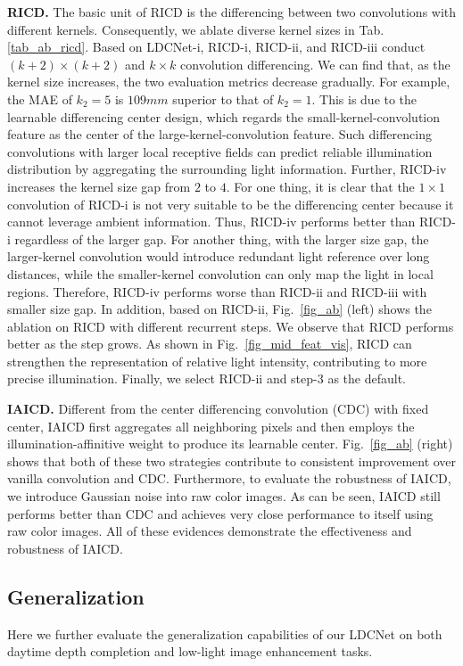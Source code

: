 \documentclass[lettersize,journal]{IEEEtran}
\begin{document}
\textbf{RICD.} The basic unit of RICD is the differencing between two convolutions with different kernels. Consequently, we ablate diverse kernel sizes in Tab. \ref{tab_ab_ricd}. Based on LDCNet-i, RICD-i, RICD-ii, and RICD-iii conduct $(k+2)\times (k+2)$ and $k\times k$ convolution differencing. We can find that, as the kernel size increases, the two evaluation metrics decrease gradually. For example, the MAE of $k_2=5$ is $109mm$ superior to that of $k_2=1$. This is due to the learnable differencing center design, which regards the small-kernel-convolution feature as the center of the large-kernel-convolution feature. Such differencing convolutions with larger local receptive fields can predict reliable illumination distribution by aggregating the surrounding light information. Further, RICD-iv increases the kernel size gap from $2$ to $4$. For one thing, it is clear that the $1\times 1$ convolution of RICD-i is not very suitable to be the differencing center because it cannot leverage ambient information. Thus, RICD-iv performs better than RICD-i regardless of the larger gap. For another thing, with the larger size gap, the larger-kernel convolution would introduce redundant light reference over long distances, while the smaller-kernel convolution can only map the light in local regions. Therefore, RICD-iv performs worse than RICD-ii and RICD-iii with smaller size gap. In addition, based on RICD-ii, Fig.~\ref{fig_ab} (left) shows the ablation on RICD with different recurrent steps. We observe that RICD performs better as the step grows. As shown in Fig.~\ref{fig_mid_feat_vis}, RICD can strengthen the representation of relative light intensity, contributing to more precise illumination. Finally, we select RICD-ii and step-3 as the default. 

\textbf{IAICD.} Different from the center differencing convolution (CDC) \cite{yu2020searching} with fixed center, IAICD first aggregates all neighboring pixels and then employs the illumination-affinitive weight to produce its learnable center. Fig.~\ref{fig_ab} (right) shows that both of these two strategies contribute to consistent improvement over vanilla convolution and CDC. Furthermore, to evaluate the robustness of IAICD, we introduce Gaussian noise into raw color images. As can be seen, IAICD still performs better than CDC and achieves very close performance to itself using raw color images. All of these evidences demonstrate the effectiveness and robustness of IAICD. 



\subsection{Generalization}
Here we further evaluate the generalization capabilities of our LDCNet on both daytime depth completion \cite{Uhrig2017THREEDV} and low-light image enhancement \cite{zhang2021beyond} tasks. 
\end{document}
